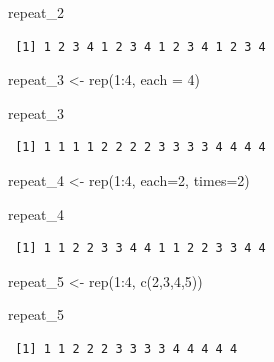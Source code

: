 \documentclass[
  letterpaper,
  DIV=11,
  numbers=noendperiod]{scrartcl}
\newenvironment{Shaded}{\begin{snugshade}}{\end{snugshade}}
\newcommand{\AttributeTok}[1]{\textcolor[rgb]{0.40,0.45,0.13}{#1}}
\newcommand{\DecValTok}[1]{\textcolor[rgb]{0.68,0.00,0.00}{#1}}
\newcommand{\FunctionTok}[1]{\textcolor[rgb]{0.28,0.35,0.67}{#1}}
\newcommand{\NormalTok}[1]{\textcolor[rgb]{0.00,0.23,0.31}{#1}}
\newcommand{\OtherTok}[1]{\textcolor[rgb]{0.00,0.23,0.31}{#1}}
\newcommand{\SpecialCharTok}[1]{\textcolor[rgb]{0.37,0.37,0.37}{#1}}
\begin{document}
\begin{tcolorbox}
\begin{Shaded}
\begin{Highlighting}[]
\NormalTok{repeat\_2}
\end{Highlighting}
\end{Shaded}

\begin{verbatim}
 [1] 1 2 3 4 1 2 3 4 1 2 3 4 1 2 3 4
\end{verbatim}

\begin{Shaded}
\begin{Highlighting}[]
\NormalTok{repeat\_3 }\OtherTok{\textless{}{-}} \FunctionTok{rep}\NormalTok{(}\DecValTok{1}\SpecialCharTok{:}\DecValTok{4}\NormalTok{, }\AttributeTok{each =} \DecValTok{4}\NormalTok{)}

\NormalTok{repeat\_3}
\end{Highlighting}
\end{Shaded}

\begin{verbatim}
 [1] 1 1 1 1 2 2 2 2 3 3 3 3 4 4 4 4
\end{verbatim}

\begin{Shaded}
\begin{Highlighting}[]
\NormalTok{repeat\_4 }\OtherTok{\textless{}{-}} \FunctionTok{rep}\NormalTok{(}\DecValTok{1}\SpecialCharTok{:}\DecValTok{4}\NormalTok{, }\AttributeTok{each=}\DecValTok{2}\NormalTok{, }\AttributeTok{times=}\DecValTok{2}\NormalTok{)}

\NormalTok{repeat\_4}
\end{Highlighting}
\end{Shaded}

\begin{verbatim}
 [1] 1 1 2 2 3 3 4 4 1 1 2 2 3 3 4 4
\end{verbatim}

\begin{Shaded}
\begin{Highlighting}[]
\NormalTok{repeat\_5 }\OtherTok{\textless{}{-}} \FunctionTok{rep}\NormalTok{(}\DecValTok{1}\SpecialCharTok{:}\DecValTok{4}\NormalTok{, }\FunctionTok{c}\NormalTok{(}\DecValTok{2}\NormalTok{,}\DecValTok{3}\NormalTok{,}\DecValTok{4}\NormalTok{,}\DecValTok{5}\NormalTok{))}

\NormalTok{repeat\_5}
\end{Highlighting}
\end{Shaded}

\begin{verbatim}
 [1] 1 1 2 2 2 3 3 3 3 4 4 4 4 4
\end{verbatim}


\end{tcolorbox}
\end{document}
